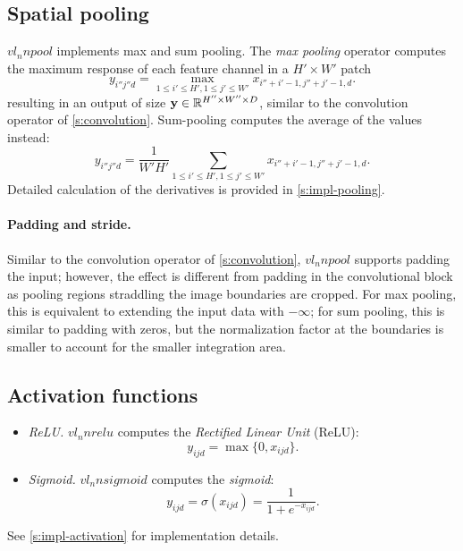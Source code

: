 \subsection{Spatial pooling}\label{s:pooling}

$vl_nnpool$ implements max and sum pooling. The \emph{max pooling} operator computes the maximum response of each feature channel in a $H' \times W'$ patch
\[
y_{i''j''d} = \max_{1\leq i' \leq H', 1 \leq j' \leq W'} x_{i''+i'-1,j''+j'-1,d}.
\]
resulting in an output of size $\mathbf{y}\in\mathbb{R}^{H''\times W'' \times D}$, similar to the convolution operator of \cref{s:convolution}. Sum-pooling computes the average of the values instead:
\[
y_{i''j''d} = \frac{1}{W'H'}
\sum_{1\leq i' \leq H', 1 \leq j' \leq W'} x_{i''+i'-1,j''+j'-1,d}.
\]
Detailed calculation of the derivatives is provided in \cref{s:impl-pooling}.

\paragraph{Padding and stride.} Similar to the convolution operator of \cref{s:convolution}, $vl_nnpool$ supports padding the input; however, the effect is different from padding in the convolutional block as pooling regions straddling the image boundaries are cropped. For max pooling, this is equivalent to extending the input data with $-\infty$; for sum pooling, this is similar to padding with zeros, but the normalization factor at the boundaries is smaller to account for the smaller integration area.

\subsection{Activation functions}\label{s:activation}

%
\begin{itemize}
	\item \emph{ReLU.} $vl_nnrelu$ computes the \emph{Rectified Linear Unit} (ReLU):
	\[
	y_{ijd} = \max\{0, x_{ijd}\}.
	\]
	
	\item \emph{Sigmoid.} $vl_nnsigmoid$ computes the \emph{sigmoid}:
	\[
	y_{ijd} = \sigma(x_{ijd}) = \frac{1}{1+e^{-x_{ijd}}}.
	\]
\end{itemize}
%
See \cref{s:impl-activation} for implementation details.

